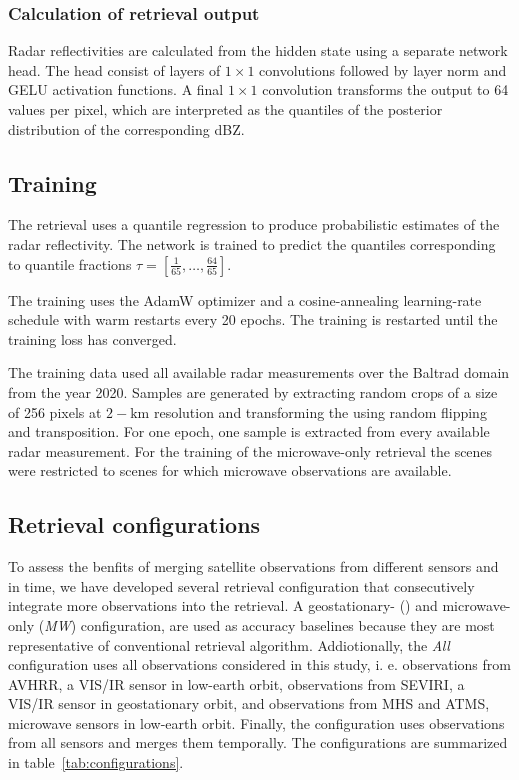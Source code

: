 \documentclass[11pt]{scrartcl}
\begin{document}
\subsubsection{Calculation of retrieval output}

Radar reflectivities are calculated from the hidden state using a separate
network head. The head consist of layers of $1 \times 1$ convolutions followed
by layer norm \citep{ba16} and GELU \citep{hendrycks16} activation functions. A
final $1 \times 1$ convolution transforms the output to 64 values per pixel,
which are interpreted as the quantiles of the posterior distribution of the
corresponding dBZ.

\subsection{Training}

The retrieval uses a quantile regression \citep{pfreundschuh18} to produce
probabilistic estimates of the radar reflectivity. The network is trained to
predict the quantiles corresponding to quantile fractions
$\tau = [\frac{1}{65}, \ldots, \frac{64}{65}]$.

The training uses the AdamW \citep{loshchilov18} optimizer and a
cosine-annealing learning-rate schedule with warm restarts every 20 epochs. The
training is restarted until the training loss has converged.

The training data used all available radar measurements over the Baltrad domain
from the year 2020. Samples are generated by extracting random crops of a size
of 256 pixels at $2-\si{\kilo \meter}$ resolution and transforming the using
random flipping and transposition. For one epoch, one sample is extracted from
every available radar measurement. For the training of the microwave-only
retrieval the scenes were restricted to scenes for which microwave observations
are available.

\subsection{Retrieval configurations}

To assess the benfits of merging satellite observations from different sensors
and in time, we have developed several retrieval configuration that
consecutively integrate more observations into the retrieval. A geostationary-
() and microwave-only (\textit{MW}) configuration, are used as
accuracy baselines because they are most representative of conventional
retrieval algorithm. Addiotionally, the \textit{All} configuration uses all
observations considered in this study, i. e. observations from AVHRR, a VIS/IR
sensor in low-earth orbit, observations from SEVIRI, a VIS/IR sensor in
geostationary orbit, and observations from MHS and ATMS, microwave sensors in
low-earth orbit. Finally, the  configuration uses
observations from all sensors and merges them temporally. The configurations
are summarized in table~\ref{tab:configurations}.
\end{document}
